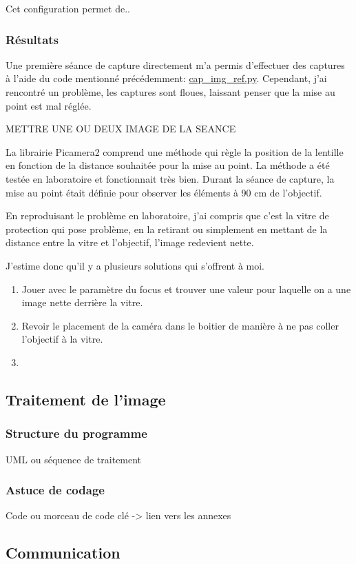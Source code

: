 Cet configuration permet de..
\subsubsection{Résultats}
Une première séance de capture directement m'a permis d'effectuer des captures à l'aide du code mentionné précédemment: \underline{cap\_img\_ref.py}. Cependant, j'ai rencontré un problème, les captures sont floues, laissant penser que la mise au point est mal réglée.

METTRE UNE OU DEUX IMAGE DE LA SEANCE

La librairie Picamera2 \cite{picamera2} comprend une méthode qui règle la position de la lentille en fonction de la distance souhaitée pour la mise au point. La méthode a été testée en laboratoire et fonctionnait très bien. Durant la séance de capture,
la mise au point était définie pour observer les éléments à 90 \si{\centi\meter} de l'objectif.

En reproduisant le problème en laboratoire, j'ai compris que c'est la vitre de protection qui pose problème, en la retirant ou simplement en mettant de la distance entre la vitre et l'objectif, l'image redevient nette.

J'estime donc qu'il y a plusieurs solutions qui s'offrent à moi.
\begin{enumerate}
    \item Jouer avec le paramètre du focus et trouver une valeur pour laquelle on a une image nette derrière la vitre.
    \item Revoir le placement de la caméra dans le boitier de manière à ne pas coller l'objectif à la vitre.
    \item
\end{enumerate}

\subsection{Traitement de l'image}
\subsubsection{Structure du programme}
UML ou séquence de traitement
\subsubsection{Astuce de codage}
Code ou morceau de code clé -> lien vers les annexes
\subsection{Communication}